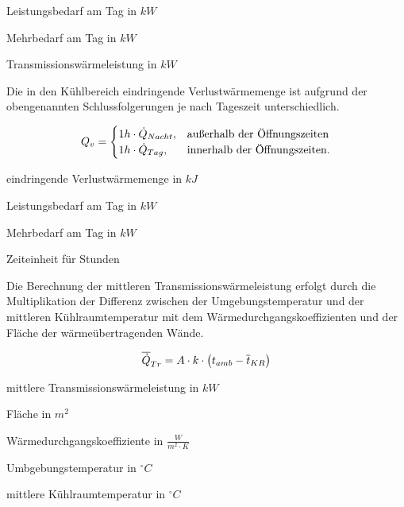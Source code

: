 \begin{description}[\dth]

	\item[$\ptag$] Leistungsbedarf am Tag in $kW$
	\item[$\pmehr$] Mehrbedarf am Tag in $kW$
	\item[$\ptrans$] Transmissionswärmeleistung in $kW$

\end{description}
\vspace{0.5cm}

Die in den K\"uhlbereich eindringende Verlustw\"armemenge ist aufgrund der
obengenannten Schlussfolgerungen je nach Tageszeit unterschiedlich.

\begin{equation}
	Q_v = \begin{cases}
	1h \cdot \pnacht, & \text{au\ss erhalb der \"Offnungszeiten}\\
	1h \cdot \ptag, & \text{innerhalb der \"Offnungszeiten.}
	\end{cases}
\label{qv}
\end{equation}

\begin{description}[\dth]

	\item[$Q_v$] eindringende Verlustwärmemenge in $kJ$
	\item[$\ptag$] Leistungsbedarf am Tag in $kW$
	\item[$\pnacht$] Mehrbedarf am Tag in $kW$
	\item[$h$] Zeiteinheit f\"ur Stunden

\end{description}
\vspace{0.5cm}

Die Berechnung der mittleren Transmissionswärmeleistung erfolgt durch die
Multiplikation der Differenz zwischen der Umgebungstemperatur und der mittleren
Kühlraumtemperatur mit dem Wärmedurchgangskoeffizienten und der Fläche der
wärmeübertragenden Wände.

\begin{equation}
	\aptrans = A \cdot k \cdot \left( t_{amb} -
	\overline{t}_{KR} \right)
	\label{aptrans}
\end{equation}

\begin{description}[\dth]

	\item[$\aptrans$] mittlere Transmissionswärmeleistung in $kW$
	\item[$A$] Fläche in $m^2$
	\item[$k$] Wärmedurchgangskoeffiziente in $\frac{W}{m^2 \cdot K}$
	\item[$t_{amb}$] Umbgebungstemperatur in $^{\circ}C$
	\item[$\overline{t}_{KR}$] mittlere Kühlraumtemperatur in
		$^{\circ}C$
\end{description}
\vspace{0.5cm}

